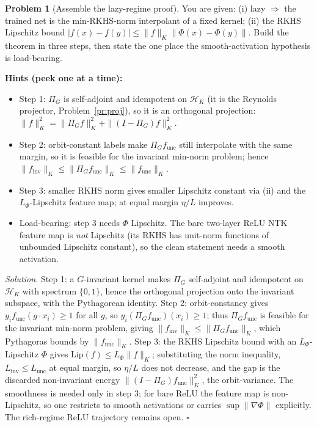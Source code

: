 \documentclass[11pt]{article}
\theoremstyle{plain}
\theoremstyle{definition}
\newtheorem{problem}{Problem}[section]
\theoremstyle{remark}
\newenvironment{hints}{\par\smallskip\noindent\textbf{\color{hintc}Hints (peek one at a time):}\begin{itemize}}{\end{itemize}\par\smallskip}
\newenvironment{solution}{\par\smallskip\noindent\textit{Solution.}\;}{\hfill$\square$\par\smallskip}
\begin{document}
\begin{problem}[Assemble the lazy-regime proof]\label{pr:lazy}
You are given: (i) lazy $\Rightarrow$ the trained net is the min-RKHS-norm interpolant of a fixed kernel; (ii) the RKHS
Lipschitz bound $|f(x)-f(y)|\le\|f\|_K\|\Phi(x)-\Phi(y)\|$. Build the theorem in three steps, then state the one place
the smooth-activation hypothesis is load-bearing.
\end{problem}
\begin{hints}
\item Step 1: $\Pi_G$ is self-adjoint and idempotent on $\mathcal H_K$ (it is the Reynolds projector, Problem~\ref{pr:proj}), so it is an orthogonal projection: $\|f\|_K^2=\|\Pi_Gf\|_K^2+\|(I-\Pi_G)f\|_K^2$.
\item Step 2: orbit-constant labels make $\Pi_Gf_{\mathrm{unc}}$ still interpolate with the same margin, so it is feasible for the invariant min-norm problem; hence $\|f_{\mathrm{inv}}\|_K\le\|\Pi_Gf_{\mathrm{unc}}\|_K\le\|f_{\mathrm{unc}}\|_K$.
\item Step 3: smaller RKHS norm gives smaller Lipschitz constant via (ii) and the $L_\Phi$-Lipschitz feature map; at equal margin $\eta/L$ improves.
\item Load-bearing: step 3 needs $\Phi$ Lipschitz. The bare two-layer ReLU NTK feature map is \emph{not} Lipschitz (its RKHS has unit-norm functions of unbounded Lipschitz constant), so the clean statement needs a smooth activation.
\end{hints}
\begin{solution}
Step 1: a $G$-invariant kernel makes $\Pi_G$ self-adjoint and idempotent on $\mathcal H_K$ with spectrum $\{0,1\}$,
hence the orthogonal projection onto the invariant subspace, with the Pythagorean identity. Step 2: orbit-constancy
gives $y_if_{\mathrm{unc}}(g\cdot x_i)\ge1$ for all $g$, so $y_i(\Pi_Gf_{\mathrm{unc}})(x_i)\ge1$; thus
$\Pi_Gf_{\mathrm{unc}}$ is feasible for the invariant min-norm problem, giving $\|f_{\mathrm{inv}}\|_K\le\|\Pi_Gf_{\mathrm{unc}}\|_K$,
which Pythagoras bounds by $\|f_{\mathrm{unc}}\|_K$. Step 3: the RKHS Lipschitz bound with an $L_\Phi$-Lipschitz $\Phi$
gives $\mathrm{Lip}(f)\le L_\Phi\|f\|_K$; substituting the norm inequality, $L_{\mathrm{inv}}\le L_{\mathrm{unc}}$ at
equal margin, so $\eta/L$ does not decrease, and the gap is the discarded non-invariant energy
$\|(I-\Pi_G)f_{\mathrm{unc}}\|_K^2$, the orbit-variance. The smoothness is needed only in step 3; for bare ReLU the
feature map is non-Lipschitz, so one restricts to smooth activations or carries $\sup\|\nabla\Phi\|$ explicitly. The
rich-regime ReLU trajectory remains open.
\end{solution}
\end{document}
